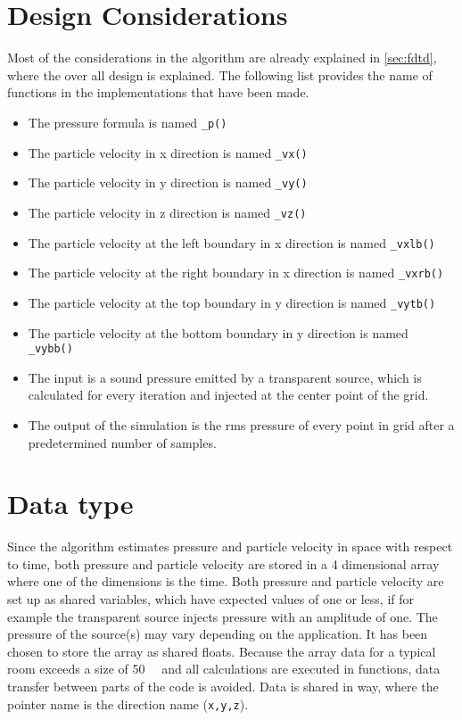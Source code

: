 \section{Design Considerations} \label{ch:considerations}
Most of the considerations in the algorithm are already explained in \autoref{sec:fdtd}, where the over all design is explained. The following list provides the name of functions in the implementations that have been made. 

\begin{itemize}
\item The pressure formula is named \texttt{_p()} 
\item The particle velocity in x direction is named \texttt{_vx()}
\item The particle velocity in y direction is named \texttt{_vy()}
\item The particle velocity in z direction is named \texttt{_vz()}
\item The particle velocity at the left boundary in x direction is named \texttt{_vxlb()}
\item The particle velocity at the right boundary in x direction is named \texttt{_vxrb()}
\item The particle velocity at the top boundary in y direction is named \texttt{_vytb()}
\item The particle velocity at the bottom boundary in y direction is named \texttt{_vybb()}
\item The input is a sound pressure emitted by a transparent source, which is calculated for every iteration and injected at the center point of the grid. 
\item The output of the simulation is the \gls{rms} pressure of every point in grid after a predetermined number of samples.
\end{itemize}

\section{Data type}
Since the algorithm estimates pressure and particle velocity in space with respect to time, both pressure and particle velocity are stored in a 4 dimensional array where one of the dimensions is the time. Both pressure and particle velocity are set up as shared variables, which have expected values of one or less, if for example the transparent source injects pressure with an amplitude of one. The pressure of the source(s) may vary depending on the application. It has been chosen to store the array as shared floats. Because the array data for a typical room exceeds a size of \SI{50}{\mega\byte} and all calculations are executed in functions, data transfer between parts of the code is avoided. Data is shared in way, where the pointer name is the direction name (\texttt{x,y,z}).


